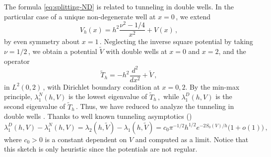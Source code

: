 \documentclass[11pt]{amsart}
\numberwithin{equation}{section}
\theoremstyle{remark}
\begin{document}
The formula \eqref{eq:splitting-ND} is related to tunneling in double wells.   
In the particular case of a unique non-degenerate well at $x=0\,$, we extend
\[V_h(x)=h^2\frac{\nu^2-1/4}{x^2}+V(x)\,,\]
by even symmetry about $x=1\,.$ Neglecting the inverse square potential by taking $\nu=1/2\,$, we obtain a potential $\tilde V$ with double wells at $x=0$ and $x=2$, and the operator
\[\tilde T_h=-h^2\frac{d^2}{dx^2}+\tilde V\,,\]
in $L^2(0,2)\,$, with Dirichlet boundary condition at $x=0,2$. By the min-max principle, $\lambda_1^N(h,V)$ is the lowest eigenvalue of $\tilde T_h\,,$ while $\lambda_1^D(h,V)$ is the second eigenvalue of $\tilde T_h\,$. Thus, we have reduced to analyze the tunneling in double wells \cite{Ha, HS}. Thanks to well known tunneling asymptotics (\cite[p.~59, Eq. (4.5.21)]{He})
\[\lambda_1^D(h,V)-\lambda_1^N(h,V)=\lambda_2(h,\tilde V)-\lambda_1(h,\tilde V)= c_0\pi^{-1/2}h^{1/2}e^{-2S_0(V)/h}\bigl(1+o(1)\bigr)\,, \]
where $c_0>0$ is a constant dependent on $V$ and computed as a limit.
Notice that this sketch is only heuristic since the potentials are not regular.
\end{document}
